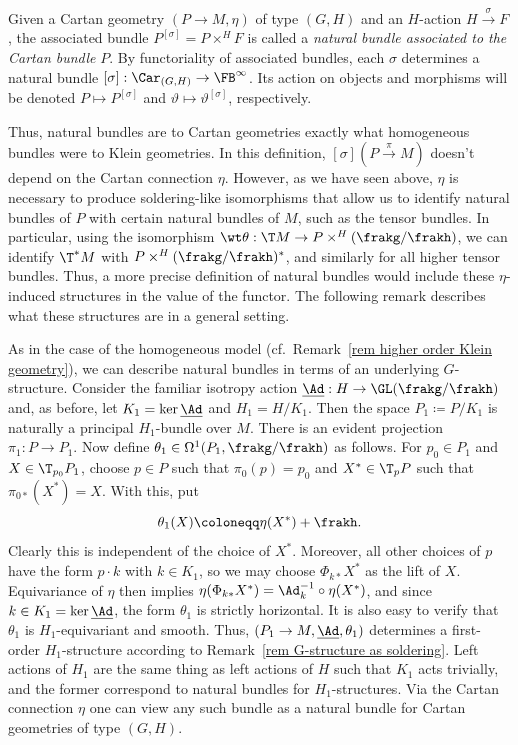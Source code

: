 \begin{defn}
    Given a Cartan geometry $(P\to M,\eta)$ of type $(G,H)$ and an $H$-action $H\overset{\sigma}{\to}F$, the associated bundle $P^{[\sigma]}=P\times^H F$ is called a \emph{natural bundle associated to the Cartan bundle} $P$. By functoriality of associated bundles, each $\sigma$ determines a natural bundle $[\sigma]:\Car_{(G,H)}\to \FB^\infty$. Its action on objects and morphisms will be denoted $P\mapsto P^{[\sigma]}$ and $\vartheta\mapsto \vartheta^{[\sigma]}$, respectively.
\end{defn}

Thus, natural bundles are to Cartan geometries exactly what homogeneous bundles were to Klein geometries. In this definition, $[\sigma](P\overset{\pi}{\to} M)$ doesn't depend on the Cartan connection $\eta$. However, as we have seen above, $\eta$ is necessary to produce soldering-like isomorphisms that allow us to identify natural bundles of $P$ with certain natural bundles of $M$, such as the tensor bundles. In particular, using the isomorphism $\wt\theta:\T M\to P\times^H(\frakg\slash\frakh)$, we can identify $\T^\ast M$ with $P\times^H(\frakg\slash\frakh)^\ast$, and similarly for all higher tensor bundles. Thus, a more precise definition of natural bundles would include these $\eta$-induced structures in the value of the functor. The following remark describes what these structures are in a general setting.

\begin{rem}
    As in the case of the homogeneous model (cf.\ Remark~\ref{rem higher order Klein geometry}), we can describe natural bundles in terms of an underlying $G$-structure. Consider the familiar isotropy action $\underline{\Ad}:H\to \GL(\frakg\slash\frakh)$ and, as before, let $K_1=\ker \underline{\Ad}$ and $H_1=H\slash K_1$. Then the space $P_1\coloneqq P\slash K_1$ is naturally a principal $H_1$-bundle over $M$. There is an evident projection $\pi_1:P\to P_1$. Now define $\theta_1\in\Omega^1(P_1,\frakg\slash\frakh)$ as follows. For $p_0\in P_1$ and $X\in \T_{p_0}P_1$, choose $p\in P$ such that $\pi_0(p)=p_0$ and $X^\ast\in \T_p P$ such that $\pi_{0\ast}(X^\ast)=X$. With this, put 
    \[\theta_1(X)\coloneqq \eta(X^\ast)+\frakh.\]
    Clearly this is independent of the choice of $X^\ast$. Moreover, all other choices of $p$ have the form $p\cdot k$ with $k\in K_1$, so we may choose $\Phi_{k\ast}X^\ast$ as the lift of $X$. Equivariance of $\eta$ then implies $\eta(\Phi_{k\ast }X^\ast)=\Ad_k^{-1}\circ \eta(X^\ast)$, and since $k\in K_1=\ker \underline{\Ad}$, the form $\theta_1$ is strictly horizontal. It is also easy to verify that $\theta_1$ is $H_1$-equivariant and smooth. Thus, $(P_1\to M,\underline{\Ad},\theta_1)$ determines a first-order $H_1$-structure according to Remark~\ref{rem G-structure as soldering}. Left actions of $H_1$ are the same thing as left actions of $H$ such that $K_1$ acts trivially, and the former correspond to natural bundles for $H_1$-structures. Via the Cartan connection $\eta$ one can view any such bundle as a natural bundle for Cartan geometries of type $(G,H)$.
\end{rem}

